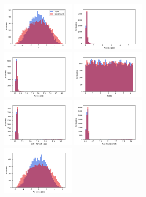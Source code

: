 \documentclass[final,5p,times,twocolumn]{elsarticle}
\begin{document}
\begin{figure}[t]
\centering
\includegraphics[width=0.33\textwidth]{input_gpd_eta.png}
\includegraphics[width=0.33\textwidth]{input_gpd_eta_spread_charged.png}
\includegraphics[width=0.33\textwidth]{input_gpd_eta_spread_neutral.png}
\includegraphics[width=0.33\textwidth]{input_gpd_phi.png}
\includegraphics[width=0.33\textwidth]{input_gpd_phi_spread_charged.png}
\includegraphics[width=0.33\textwidth]{input_gpd_phi_spread_neutral.png}
\includegraphics[width=0.33\textwidth]{input_gpd_hAvEta.png}

\end{figure}
\end{document}
